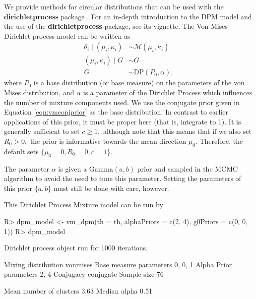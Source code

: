 \documentclass{article}
\newcommand{\pkg}[1]{\textbf{#1}}
\newenvironment{CodeChunk}{}{}
\begin{document}
We provide methods for circular distributions that can be used with the
\pkg{dirichletprocess} package \citep{dirichletprocesspackage}. For an
in-depth introduction to the DPM model and the use of the
\pkg{dirichletprocess} package, see its vignette. The Von Mises
Dirichlet process model can be written as \begin{align}
\theta_i \mid (\mu_i, \kappa_i) &\sim \mathcal{M}(\mu_i, \kappa_i) \\
(\mu_i, \kappa_i) \mid G  &\sim G \\
G &\sim \text{DP}(P_0, \alpha),
\end{align} where \(P_0\) is a base distribution (or base measure) on
the parameters of the von Mises distribution, and \(\alpha\) is a
parameter of the Dirichlet Process which influences the number of
mixture components used. We use the conjugate prior given in Equation
\ref{eqn:vmconjprior} as the base distribution. In contrast to earlier
applications of this prior, it must be proper here (that is, integrate
to 1). It is generally sufficient to set \(c \geq 1,\) although note
that this means that if we also set \(R_0 > 0,\) the prior is
informative towards the mean direction \(\mu_0\). Therefore, the default
sets \(\{\mu_0 = 0, R_0 = 0, c = 1\}.\)

The parameter \(\alpha\) is given a \(\text{Gamma}(a, b)\) prior and
sampled in the MCMC algorithm to avoid the need to tune this parameter.
Setting the parameters of this prior \(\{a, b\}\) must still be done
with care, however.

This Dirichlet Process Mixture model can be run by

\begin{CodeChunk}
	
	\begin{CodeInput}
		R> dpm_model <- vm_dpm(th = th, alphaPriors = c(2, 4), g0Priors = c(0, 0, 1))
		R> dpm_model
	\end{CodeInput}
	
	\begin{CodeOutput}
		Dirichlet process object run for 1000 iterations.
		
		Mixing distribution       vonmises
		Base measure parameters    0, 0, 1
		Alpha Prior parameters        2, 4
		Conjugacy                conjugate
		Sample size                     76
		
		Mean number of clusters       3.63
		Median alpha                  0.51
	\end{CodeOutput}
\end{CodeChunk}
\end{document}
